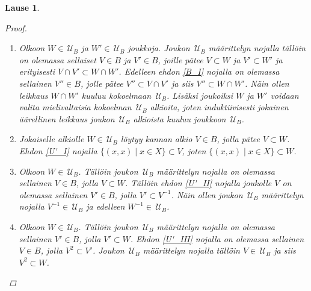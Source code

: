 \documentclass[12pt,a4paper,leqno]{report}
\newcommand{\U}{\,\mathcal{U}}
\theoremstyle{plain}
\newtheorem{lause}[equation]{Lause}
\theoremstyle{definition}
\theoremstyle{remark}
\begin{document}
\begin{lause}
\begin{proof}
\begin{enumerate}
Toisaalta jos osajoukolle $W'\subset X\times X$ pätee $V\subset W \subset W'$, 
niin $W'\in\U_B$. \\
Siis jos $W\in \U_B$ ja $W\subset W'\subset X\times X$ niin $ W'\in\U_B$.
\item[\ref{F_II}] Olkoon $W\in\U_B$ ja $W'\in\U_B$ joukkoja. 
Joukon $\U_B$ määrittelyn nojalla tällöin on olemassa 
sellaiset $V\in B$ ja $V'\in B$, 
joille pätee $V\subset W$ ja $V'\subset W'$ ja 
erityisesti $V\cap V'\subset W\cap W'$. 
Edelleen ehdon \ref{B_I} nojalla on olemassa sellainen $V''\in B$, 
jolle pätee $V''\subset V\cap V'$ ja siis $V''\subset W\cap W'$. 
Näin ollen leikkaus $W\cap W'$ kuuluu kokoelmaan $\U_B$. 
Lisäksi joukoiksi $W$ ja $W'$ voidaan valita mielivaltaisia kokoelman $\U_B$ alkioita, 
joten induktiivisesti jokainen äärellinen leikkaus joukon $\U_B$ alkioista kuuluu joukkoon $\U_B$.
\item[\ref{U_I}] 
Jokaiselle alkiolle $W\in\U_B$ löytyy 
kannan alkio $V\in B$, jolla pätee $V\subset W$. 
Ehdon \ref{U'_I} nojalla $\{(x,x)\mid x\in X\}\subset V$, 
joten $\{(x,x)\mid x\in X\}\subset W$.
\item[\ref{U_II}] Olkoon $W\in\U_B$. 
Tällöin joukon $\U_B$ määrittelyn nojalla on olemassa sellainen $V\in B$, 
jolla $V\subset W$. %
Tällöin ehdon \ref{U'_II} nojalla joukolle $V$ on olemassa sellainen $V'\in B$, 
jolla $V'\subset V^{-1}$. 
Näin ollen joukon $\U_B$ määrittelyn nojalla $V^{-1}\in\U_B$ ja 
edelleen $W^{-1}\in\U_B$. 
\item[\ref{U_III}] Olkoon $W\in\U_B$. 
Tällöin joukon $\U_B$ määrittelyn nojalla on olemassa sellainen $V'\in B$, 
jolla $V'\subset W$. 
Ehdon \ref{U'_III} nojalla on olemassa sellainen $V\in B$, jolla $ V^2\subset V'$. 
Joukon $\U_B$ määrittelyn nojalla tällöin $V\in \U_B$ ja siis $ V^2\subset W$.
\end{enumerate}
\end{proof}
\end{lause}
\end{document}
